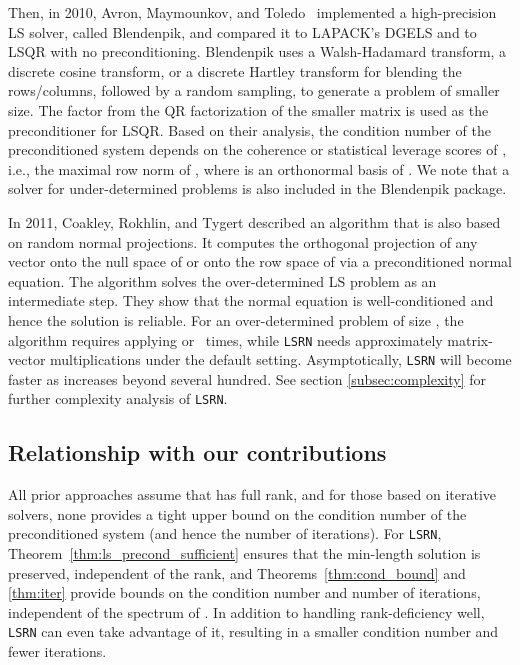 \documentclass{siamltex}
\begin{document}
Then, in 2010, Avron, Maymounkov, and Toledo~\cite{avron2010blendenpik}
implemented a high-precision LS solver, called Blendenpik, and compared it to
LAPACK's DGELS and to LSQR with no preconditioning.  Blendenpik uses a
Walsh-Hadamard transform, a discrete cosine transform, or a discrete Hartley
transform for blending the rows/columns, followed by a random sampling, to
generate a problem of smaller size.  The  factor from the QR factorization of
the smaller matrix is used as the preconditioner for LSQR.  Based on their
analysis, the condition number of the preconditioned system depends on the
coherence or statistical leverage scores of , i.e., the maximal row norm of
, where  is an orthonormal basis of .  We note that a
solver for under-determined problems is also included in the Blendenpik package.



In 2011, Coakley, Rokhlin, and Tygert \cite{coakley2011fast} described an
algorithm that is also based on random normal projections. It computes the
orthogonal projection of any vector  onto the null space of  or onto the
row space of  via a preconditioned normal equation.  The algorithm solves the
over-determined LS problem as an intermediate step. They show that the normal
equation is well-conditioned and hence the solution is reliable. For an
over-determined problem of size , the algorithm requires applying
 or \,  times, while \texttt{LSRN} needs approximately  matrix-vector multiplications under the default setting.
Asymptotically, \texttt{LSRN} will become faster as  increases beyond
several hundred.
See section \ref{subsec:complexity} for further complexity analysis of
\texttt{LSRN}.

\subsection{Relationship with our contributions}

All prior approaches assume that  has full rank, and for those based on
iterative solvers, none provides a tight upper bound on the condition number of
the preconditioned system (and hence the number of iterations). For
\texttt{LSRN}, Theorem~\ref{thm:ls_precond_sufficient} ensures that the
min-length solution is preserved, independent of the rank, and
Theorems~\ref{thm:cond_bound} and \ref{thm:iter} provide bounds on the condition
number and number of iterations, independent of the spectrum of .  In
addition to handling rank-deficiency well, \texttt{LSRN} can even take advantage
of it, resulting in a smaller condition number and fewer iterations.
\end{document}
